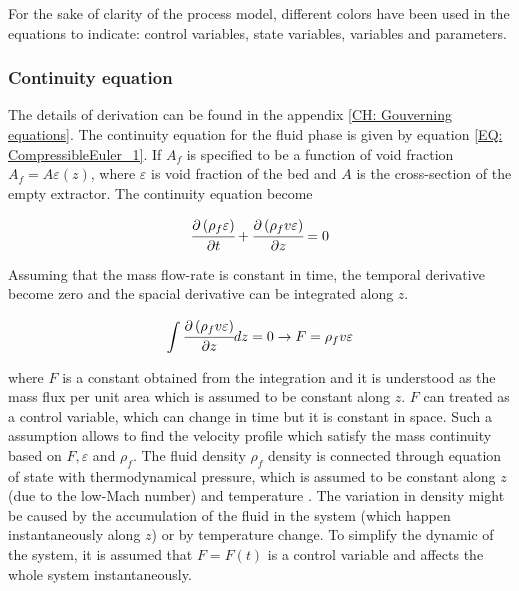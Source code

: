 \documentclass[../Article_Model_Parameters.tex]{subfiles}
\begin{document}
		
	For the sake of clarity of the process model, different colors have been used in the equations to indicate: 
	{\color{red}control variables},
	{\color{blue}state variables},
	{\color{orange}variables} and
	{\color{magenta}parameters}.
	
	\subsubsection{Continuity equation} \label{CH: Continuity}
	The details of derivation can be found in the appendix \ref{CH: Gouverning equations}. The continuity equation for the fluid phase is given by equation \ref{EQ: CompressibleEuler_1}. If $A_f$ is specified to be a function of void fraction $A_f = A\varepsilon(z)$, where $\varepsilon$ is void fraction of the bed and $A$ is the cross-section of the empty extractor. The continuity equation become
	
	{\footnotesize
		\begin{equation*}
			\cfrac{\partial \left( \rho_f \varepsilon \right)}{\partial t} + \cfrac{\partial \left( \rho_f v \varepsilon \right)}{\partial z} = 0
		\end{equation*}
	}
	
	Assuming that the mass flow-rate is constant in time, the temporal derivative become zero and the spacial derivative can be integrated along $z$.
	
	{\footnotesize
		\begin{equation}
			\int \cfrac{\partial \left( \rho_f v \varepsilon \right)}{\partial z} dz = 0 \rightarrow F=\rho_f v \varepsilon
		\end{equation}
	}

	where $F$ is a constant obtained from the integration and it is understood as the mass flux per unit area which is assumed to be constant along $z$. $F$ can treated as a control variable, which can change in time but it is constant in space. Such a assumption allows to find the velocity profile which satisfy the mass continuity based on $F, \varepsilon$ and $\rho_f$. The fluid density $\rho_f$ density is connected through equation of state with thermodynamical pressure, which is assumed to be constant along $z$ (due to the low-Mach number) and temperature . The variation in density might be caused by the accumulation of the fluid  in the system (which happen instantaneously along $z$) or by temperature change. To simplify the dynamic of the system, it is assumed that $F=F(t)$ is a control variable and affects the whole system instantaneously.
	
\end{document}
